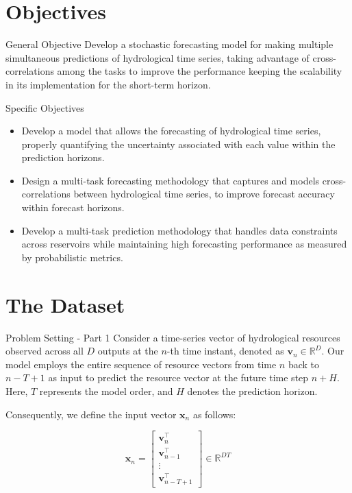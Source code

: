\section{Objectives}
\begin{frame}{General Objective}
	Develop a stochastic forecasting model for making multiple simultaneous predictions of hydrological time series, taking advantage of cross-correlations among the tasks to improve the performance keeping the scalability in its implementation for the short-term horizon.	
\end{frame}

\begin{frame}{Specific Objectives}
	\begin{itemize}
		\item Develop a model that allows the forecasting of hydrological time series, properly quantifying the uncertainty associated with each value within the prediction horizons.
		\item Design a multi-task forecasting methodology that captures and models cross-correlations between hydrological time series, to improve forecast accuracy within forecast horizons.
		\item Develop a multi-task prediction methodology that handles data constraints across reservoirs while maintaining high forecasting performance as measured by probabilistic metrics.
		
	\end{itemize}
\end{frame}

\section{The Dataset}
\begin{frame}{Problem Setting - Part 1}
	Consider a time-series vector of hydrological resources observed across all $D$ outputs at the $n$-th time instant, denoted as $\mathbf{v}_n \in \mathbb{R}^D$. Our model employs the entire sequence of resource vectors from time $n$ back to $n-T+1$ as input to predict the resource vector at the future time step $n+H$. Here, $T$ represents the model order, and $H$ denotes the prediction horizon. 
	
	Consequently, we define the input vector $\mathbf{x}_n$ as follows:
	
	\begin{equation*}
	\mathbf{x}_n = \begin{bmatrix} 
	\mathbf{v}_{n}^\top \\ 
	\mathbf{v}_{n-1}^\top \\ 
	\vdots \\ 
	\mathbf{v}_{n-T+1}^\top 
	\end{bmatrix} \in \mathbb{R}^{DT}
	\end{equation*}
\end{frame}

